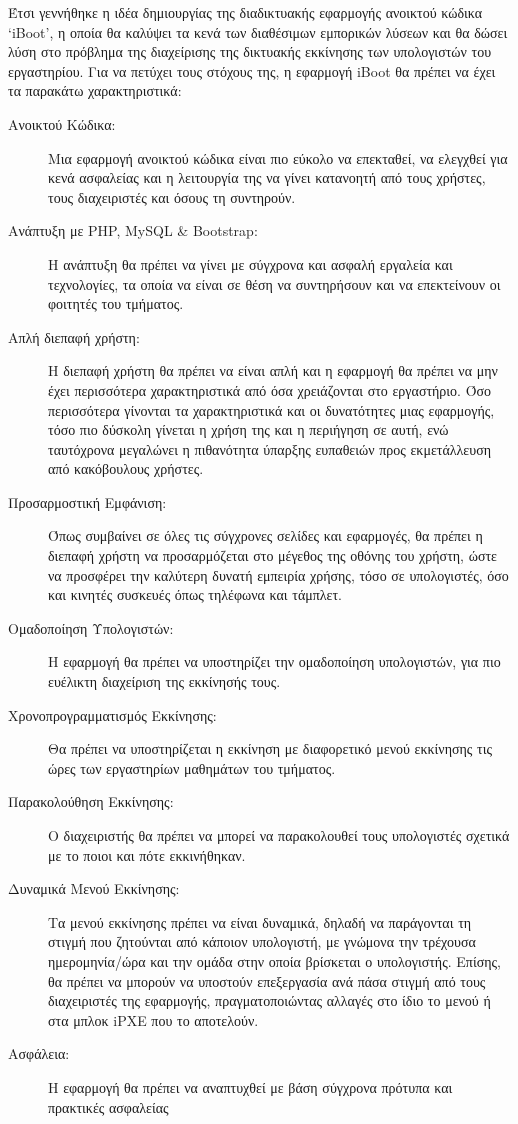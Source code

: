Έτσι γεννήθηκε η ιδέα δημιουργίας της διαδικτυακής εφαρμογής ανοικτού κώδικα `iBoot', η οποία θα καλύψει τα κενά των διαθέσιμων εμπορικών λύσεων και θα δώσει λύση στο πρόβλημα της διαχείρισης της δικτυακής εκκίνησης των υπολογιστών του εργαστηρίου. Για να πετύχει τους στόχους της, η εφαρμογή iBoot θα πρέπει να έχει τα παρακάτω χαρακτηριστικά:
\begin{description}
	\item [Ανοικτού Κώδικα:] Μια εφαρμογή ανοικτού κώδικα είναι πιο εύκολο να επεκταθεί, να ελεγχθεί για κενά ασφαλείας και η λειτουργία της να γίνει κατανοητή από τους χρήστες, τους διαχειριστές και όσους τη συντηρούν.
	\item [Ανάπτυξη με PHP, MySQL \& Bootstrap:] Η ανάπτυξη θα πρέπει να γίνει με σύγχρονα και ασφαλή εργαλεία και τεχνολογίες, τα οποία να είναι σε θέση να συντηρήσουν και να επεκτείνουν οι φοιτητές του τμήματος.
	\item [Απλή διεπαφή χρήστη:] Η διεπαφή χρήστη θα πρέπει να είναι απλή και η εφαρμογή θα πρέπει να μην έχει περισσότερα χαρακτηριστικά από όσα χρειάζονται στο εργαστήριο. Όσο περισσότερα γίνονται τα χαρακτηριστικά και οι δυνατότητες μιας εφαρμογής, τόσο πιο δύσκολη γίνεται η χρήση της και η περιήγηση σε αυτή, ενώ ταυτόχρονα μεγαλώνει η πιθανότητα ύπαρξης ευπαθειών προς εκμετάλλευση από κακόβουλους χρήστες.
	\item [Προσαρμοστική Εμφάνιση:] Όπως συμβαίνει σε όλες τις σύγχρονες σελίδες και εφαρμογές, θα πρέπει η διεπαφή χρήστη να προσαρμόζεται στο μέγεθος της οθόνης του χρήστη, ώστε να προσφέρει την καλύτερη δυνατή εμπειρία χρήσης, τόσο σε υπολογιστές, όσο και κινητές συσκευές όπως τηλέφωνα και τάμπλετ.
	\item [Ομαδοποίηση Υπολογιστών:] Η εφαρμογή θα πρέπει να υποστηρίζει την ομαδοποίηση υπολογιστών, για πιο ευέλικτη διαχείριση της εκκίνησής τους.
	\item [Χρονοπρογραμματισμός Εκκίνησης:] Θα πρέπει να υποστηρίζεται η εκκίνηση με διαφορετικό μενού εκκίνησης τις ώρες των εργαστηρίων μαθημάτων του τμήματος.
	\item [Παρακολούθηση Εκκίνησης:] Ο διαχειριστής θα πρέπει να μπορεί να παρακολουθεί τους υπολογιστές σχετικά με το ποιοι και πότε εκκινήθηκαν.
	\item [Δυναμικά Μενού Εκκίνησης:] Τα μενού εκκίνησης πρέπει να είναι δυναμικά, δηλαδή να παράγονται τη στιγμή που ζητούνται από κάποιον υπολογιστή, με γνώμονα την τρέχουσα ημερομηνία/ώρα και την ομάδα στην οποία βρίσκεται ο υπολογιστής. Επίσης, θα πρέπει να μπορούν να υποστούν επεξεργασία ανά πάσα στιγμή από τους διαχειριστές της εφαρμογής, πραγματοποιώντας αλλαγές στο ίδιο το μενού ή στα μπλοκ iPXE που το αποτελούν.
	\item[Ασφάλεια:] Η εφαρμογή θα πρέπει να αναπτυχθεί με βάση σύγχρονα πρότυπα και πρακτικές ασφαλείας
\end{description}

